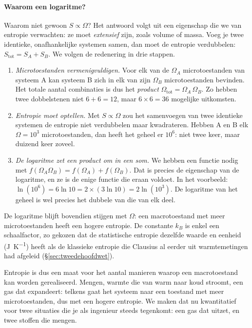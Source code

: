 \paragraph{Waarom een logaritme?} Waarom niet gewoon $S \propto \Omega$? Het antwoord volgt uit een eigenschap die we van entropie verwachten: ze moet \emph{extensief} zijn, zoals volume of massa. Voeg je twee identieke, onafhankelijke systemen samen, dan moet de entropie verdubbelen: $S_\text{tot} = S_A + S_B$. We volgen de redenering in drie stappen.
\begin{enumerate}
\item \emph{Microtoestanden vermenigvuldigen.} Voor elk van de $\Omega_A$ microtoestanden van systeem A kan systeem B zich in elk van zijn $\Omega_B$ microtoestanden bevinden. Het totale aantal combinaties is dus het \emph{product} $\Omega_\text{tot} = \Omega_A\,\Omega_B$. Zo hebben twee dobbelstenen niet $6 + 6 = 12$, maar $6 \times 6 = 36$ mogelijke uitkomsten.
\item \emph{Entropie moet optellen.} Met $S \propto \Omega$ zou het samenvoegen van twee identieke systemen de entropie niet verdubbelen maar kwadrateren. Hebben A en B elk $\Omega = 10^3$ microtoestanden, dan heeft het geheel er $10^6$: niet twee keer, maar duizend keer zoveel.
\item \emph{De logaritme zet een product om in een som.} We hebben een functie nodig met $f(\Omega_A\Omega_B) = f(\Omega_A) + f(\Omega_B)$. Dat is precies de eigenschap van de logaritme, en ze is de enige functie die eraan voldoet. In het voorbeeld: $\ln(10^6) = 6\ln 10 = 2 \times (3\ln 10) = 2\ln(10^3)$. De logaritme van het geheel is wel precies het dubbele van die van elk deel.
\end{enumerate}
De logaritme blijft bovendien stijgen met $\Omega$: een macrotoestand met meer microtoestanden heeft een hogere entropie. De constante $k_B$ is enkel een schaalfactor, zo gekozen dat de statistische entropie dezelfde waarde en eenheid (\si{\joule\per\kelvin}) heeft als de klassieke entropie die Clausius al eerder uit warmtemetingen had afgeleid (\S\ref{sec:tweedehoofdwet}).

Entropie is dus een maat voor het aantal manieren waarop een macrotoestand kan worden gerealiseerd. Mengen, warmte die van warm naar koud stroomt, een gas dat expandeert: telkens gaat het systeem naar een toestand met meer microtoestanden, dus met een hogere entropie. We maken dat nu kwantitatief voor twee situaties die je als ingenieur steeds tegenkomt: een gas dat uitzet, en twee stoffen die mengen.

